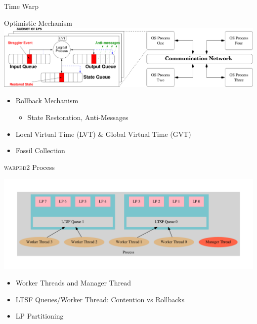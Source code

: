 \documentclass[10pt]{beamer}
\begin{document}
\begin{frame}{Time Warp}
    \begin{block}{Optimistic Mechanism}
        \bigskip
        \includegraphics[width=\textwidth]{../figs/timeWarp.pdf}
        \bigskip
        \begin{itemize}
            \item Rollback Mechanism
                \begin{itemize}
                    \item State Restoration, Anti-Messages
                \end{itemize}
            \item Local Virtual Time (LVT) \& Global Virtual Time (GVT)
            \item Fossil Collection
        \end{itemize}
    \end{block}
\end{frame}

\begin{frame}{\textsc{warped2} Process}
        \centerline{\includegraphics[width=1.2\textwidth]{../figs/graphviz/partitioning.pdf}}
        \begin{itemize}
            \item Worker Threads and Manager Thread
            \item LTSF Queues/Worker Thread: Contention vs Rollbacks
            \item LP Partitioning
        \end{itemize}
\end{frame}
\end{document}
